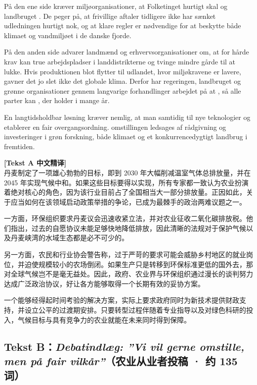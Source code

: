 På den ene side kræver miljøorganisationer, at Folketinget hurtigt skal  og  landbruget . De peger på, at frivillige aftaler tidligere ikke har sænket udledningen hurtigt nok, og at klare regler er nødvendige for at beskytte både klimaet og vandmiljøet i de danske fjorde.

På den anden side advarer landmænd og erhvervsorganisationer om, at for hårde krav kan true arbejdspladser i landdistrikterne og tvinge mindre gårde til at lukke. Hvis produktionen blot flytter til udlandet, hvor miljøkravene er lavere, gavner det jo slet ikke det globale klima. Derfor har regeringen, landbruget og grønne organisationer gennem langvarige forhandlinger arbejdet på at , så alle parter kan , der holder i mange år.

En langtidsholdbar løsning kræver nemlig, at man samtidig  til nye teknologier og etablerer en fair overgangsordning.  omstillingen ledsages af rådgivning og investeringer i grøn forskning,  både klimaet og et konkurrencedygtigt landbrug  i fremtiden.

\begin{transbox}
\small
\textbf{\color{NCDTeal}[Tekst A 中文精译]}\\
丹麦制定了一项雄心勃勃的目标，即到 2030 年大幅削减温室气体总排放量，并在 2045 年实现气候中和。如果这些目标要得以实现，所有专家都一致认为农业扮演着绝对核心的角色，因为该行业目前占了全国相当大一部分排放量。正因如此，关于应当如何在该领域启动政策举措的争论，已成为最棘手的政治两难议题之一。

一方面，环保组织要求丹麦议会迅速收紧立法，并对农业征收二氧化碳排放税。他们指出，过去的自愿协议未能足够快地降低排放，因此清晰的法规对于保护气候以及丹麦峡湾的水域生态都是必不可少的。

另一方面，农民和行业协会警告称，过于严苛的要求可能会威胁乡村地区的就业岗位，并迫使规模较小的农场倒闭。如果生产只是转移到环保标准更低的国外去，那对全球气候岂不是毫无益处。因此，政府、农业界与环保组织通过漫长的谈判努力达成广泛政治协议，好让各方能够取得一个长期有效的妥协方案。

一个能够经得起时间考验的解决方案，实际上要求政府同时为新技术提供财政支持，并设立公平的过渡期安排。只要转型过程伴随着专业指导以及对绿色科研的投入，气候目标与具有竞争力的农业就能在未来同时得到保障。
\end{transbox}

\subsection*{Tekst B：\textit{Debatindlæg: ”Vi vil gerne omstille, men på fair vilkår”}（农业从业者投稿 · 约 135 词）}

